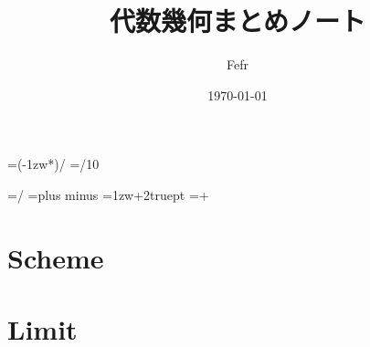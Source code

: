 \documentclass[dvipdfmx,a4paper,11pt]{jsbook}
\begin{document}
\setlength{\footskip}{20truemm}




\makeatletter
\newcount\@chars\newcount\@lines
{}                      %

\newdimen\@kanjiskip
\@kanjiskip=\dimexpr(\textwidth-1zw*\@chars)/\numexpr{}
\newdimen\@@kanjiskip
\@@kanjiskip=\dimexpr\@kanjiskip/10

\baselineskip=\dimexpr\textheight/\@lines
\kanjiskip=\@kanjiskip plus \@@kanjiskip minus \@@kanjiskip
\parindent=\dimexpr 1zw+2truept
\parindent=\dimexpr\parindent+\@kanjiskip
\makeatother




\title{代数幾何まとめノート}
\date{\today}
\author{Fefr}
\maketitle



\setcounter{tocdepth}{2}
\tableofcontents
\clearpage

\chapter{Scheme}








\clearpage
\appendix
\chapter{Limit}


\printindex
\end{document}

